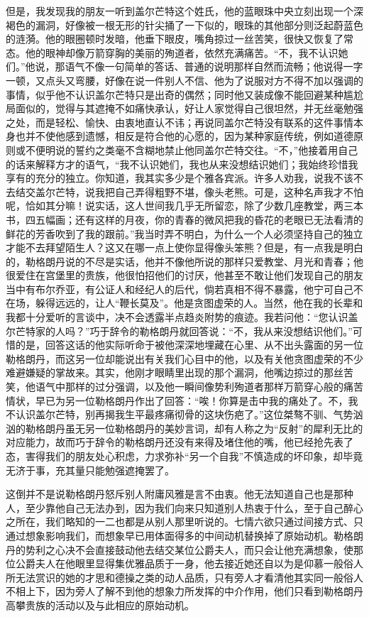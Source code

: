 \par 但是，我发现我的朋友一听到盖尔芒特这个姓氏，他的蓝眼珠中央立刻出现一个深褐色的漏洞，好像被一根无形的针尖捅了一下似的，眼珠的其他部分则泛起蔚蓝色的涟漪。他的眼圈顿时发暗，他垂下眼皮，嘴角掠过一丝苦笑，很快又恢复了常态。他的眼神却像万箭穿胸的美丽的殉道者，依然充满痛苦。“不，我不认识她们。”他说，那语气不像一句简单的答话、普通的说明那样自然而流畅；他说得一字一顿，又点头又弯腰，好像在说一件别人不信、他为了说服对方不得不加以强调的事情，似乎他不认识盖尔芒特只是出奇的偶然；同时他又装成像不能回避某种尴尬局面似的，觉得与其遮掩不如痛快承认，好让人家觉得自己很坦然，并无丝毫勉强之处，而是轻松、愉快、由衷地直认不讳；再说同盖尔芒特没有联系的这件事情本身也并不使他感到遗憾，相反是符合他的心愿的，因为某种家庭传统，例如道德原则或不便明说的誓约之类毫不含糊地禁止他同盖尔芒特交往。“不，”他接着用自己的话来解释方才的语气，“我不认识她们，我也从来没想结识她们；我始终珍惜我享有的充分的独立。你知道，我其实多少是个雅各宾派。许多人劝我，说我不该不去结交盖尔芒特，说我把自己弄得粗野不堪，像头老熊。可是，这种名声我才不怕呢，恰如其分嘛！说实话，这人世间我几乎无所留恋，除了少数几座教堂，两三本书，四五幅画；还有这样的月夜，你的青春的微风把我的昏花的老眼已无法看清的鲜花的芳香吹到了我的跟前。”我当时弄不明白，为什么一个人必须坚持自己的独立才能不去拜望陌生人？这又在哪一点上使你显得像头笨熊？但是，有一点我是明白的，勒格朗丹说的不尽是实话，他并不像他所说的那样只爱教堂、月光和青春；他很爱住在宫堡里的贵族，他很怕招他们的讨厌，他甚至不敢让他们发现自己的朋友当中有布尔乔亚，有公证人和经纪人的后代，倘若真相不得不暴露，他宁可自己不在场，躲得远远的，让人“鞭长莫及”。他是贪图虚荣的人。当然，他在我的长辈和我都十分爱听的言谈中，决不会透露半点趋炎附势的痕迹。我若问他：“您认识盖尔芒特家的人吗？”巧于辞令的勒格朗丹就回答说：“不，我从来没想结识他们。”可惜的是，回答这话的他实际听命于被他深深地埋藏在心里、从不出头露面的另一位勒格朗丹，而这另一位却能说出有关我们心目中的他，以及有关他贪图虚荣的不少难避嫌疑的掌故来。其实，他刚才眼睛里出现的那个漏洞，他嘴边掠过的那丝苦笑，他语气中那样的过分强调，以及他一瞬间像势利殉道者那样万箭穿心般的痛苦情状，早已为另一位勒格朗丹作出了回答：“唉！你算是击中我的痛处了。不，我不认识盖尔芒特，别再揭我生平最疼痛彻骨的这块伤疤了。”这位桀骜不驯、气势汹汹的勒格朗丹虽无另一位勒格朗丹的美妙言词，却有人称之为“反射”的犀利无比的对应能力，故而巧于辞令的勒格朗丹还没有来得及堵住他的嘴，他已经抢先表了态，害得我们的朋友处心积虑，力求弥补“另一个自我”不慎造成的坏印象，却毕竟无济于事，充其量只能勉强遮掩罢了。
\par 这倒并不是说勒格朗丹怒斥别人附庸风雅是言不由衷。他无法知道自己也是那种人，至少靠他自己无法办到，因为我们向来只知道别人热衷于什么，至于自己醉心之所在，我们略知的一二也都是从别人那里听说的。七情六欲只通过间接方式、只通过想象影响我们，而想象早已用体面得多的中间动机替换掉了原始动机。勒格朗丹的势利之心决不会直接鼓动他去结交某位公爵夫人，而只会让他充满想象，使那位公爵夫人在他眼里显得集优雅品质于一身，他去接近她还自以为是仰慕一般俗人所无法赏识的她的才思和德操之类的动人品质，只有旁人才看清他其实同一般俗人不相上下，因为旁人了解不到他的想象力所发挥的中介作用，他们只看到勒格朗丹高攀贵族的活动以及与此相应的原始动机。
